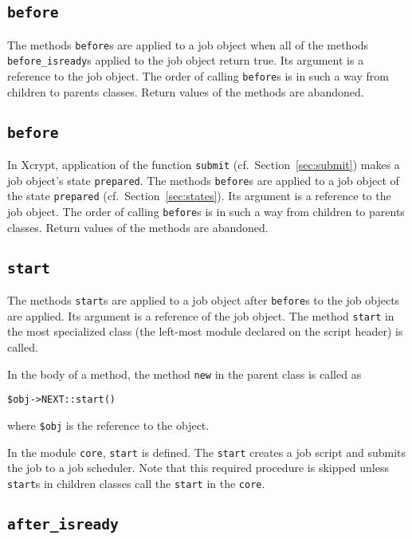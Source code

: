 \documentclass[a4paper,10pt]{report}
\def\|{\verb|} %|
\begin{document}
\subsection{\texttt{before}}

The methods \texttt{before}s are applied to a job object when all of
the methods \texttt{before\_isready}s applied to the job object return
true.  Its argument is a reference to the job object.  The order of calling
\texttt{before}s is in such a way from children to parents
classes.  Return values of the methods are abandoned.
\fi

\subsection{\texttt{before}}

In Xcrypt, application of the function \|submit| (cf.\
Section~\ref{sec:submit}) makes a job object's state \|prepared|.  The
methods \texttt{before}s are applied to a job object of the state
\|prepared| (cf.\ Section~\ref{sec:states}).  Its argument is a
reference to the job object.  The order of calling \texttt{before}s is
in such a way from children to parents classes.  Return values of the
methods are abandoned.

\subsection{\texttt{start}}

The methods \texttt{start}s are applied to a job object after
\texttt{before}s to the job objects are applied.  Its argument is a
reference of the job object.  The method \|start| in the most
specialized class (the left-most module declared on the script header)
is called.

In the body of a method, the method \|new| in the parent class is
called as
\begin{center}
 \|$obj->NEXT::start()| %
\end{center}
where \|$obj| is the reference to the object. %

In the module \|core|, \|start| is defined.  The \|start| creates a
job script and submits the job to a job scheduler.  Note that this
required procedure is skipped unless \|start|s in children classes call
the \|start| in the \|core|.

\subsection{\texttt{after\_isready}}
\end{document}
